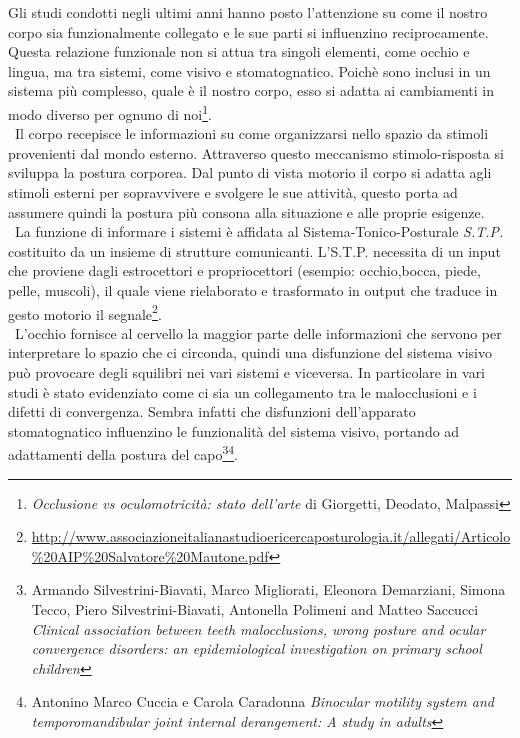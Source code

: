 



Gli studi condotti negli ultimi anni hanno posto l'attenzione su come il nostro corpo sia funzionalmente collegato e le sue parti si influenzino reciprocamente. Questa relazione funzionale non si attua tra singoli elementi, come occhio e lingua, ma tra sistemi, come visivo e stomatognatico. Poichè sono inclusi in un sistema più complesso, quale è il nostro corpo, esso si adatta ai cambiamenti in modo diverso per ognuno di noi\footnote{\emph{Occlusione vs oculomotricità: stato dell'arte} di Giorgetti, Deodato, Malpassi}.
\\\
Il corpo recepisce le informazioni su come organizzarsi nello spazio da stimoli provenienti dal mondo esterno. Attraverso questo meccanismo stimolo-risposta si sviluppa la postura corporea. Dal punto di vista motorio il corpo si adatta agli stimoli esterni per sopravvivere e svolgere le sue attività, questo porta ad assumere quindi la postura più consona alla situazione e alle proprie esigenze. 
\\\
La funzione di informare i sistemi è affidata al Sistema-Tonico-Posturale \emph{S.T.P.} costituito da un insieme di strutture comunicanti. L'S.T.P. necessita di un input che proviene dagli estrocettori e propriocettori (esempio: occhio,bocca, piede, pelle, muscoli), il quale viene rielaborato e trasformato in output che traduce in gesto motorio il segnale\footnote{\url{http://www.associazioneitalianastudioericercaposturologia.it/allegati/Articolo\%20AIP\%20Salvatore\%20Mautone.pdf}}.
\\\
L'occhio fornisce al cervello la maggior parte delle informazioni che servono per interpretare lo spazio che ci circonda, quindi una disfunzione del sistema visivo può provocare degli squilibri nei vari sistemi e viceversa. In particolare in vari studi è stato evidenziato come ci sia un collegamento tra le malocclusioni e i difetti di convergenza. Sembra infatti che disfunzioni dell'apparato stomatognatico influenzino le funzionalità del sistema visivo, portando ad adattamenti della postura del capo\footnote{Armando Silvestrini-Biavati, Marco Migliorati, Eleonora Demarziani, Simona Tecco, Piero Silvestrini-Biavati, Antonella Polimeni and Matteo Saccucci \emph{Clinical association between teeth malocclusions, wrong posture and ocular convergence disorders: an epidemiological investigation on primary school children}}\footnote{Antonino Marco Cuccia e Carola Caradonna \emph{Binocular motility system and temporomandibular joint internal derangement: A study in adults}}. 


